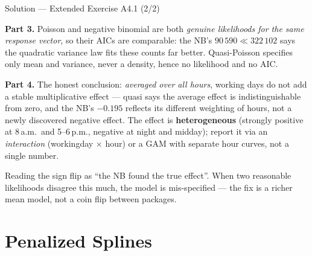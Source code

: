 \documentclass[aspectratio=169,11pt]{beamer}
\begin{document}
\begin{frame}{Solution --- Extended Exercise A4.1 (2/2)}
\begin{solutionbox}
  \textbf{Part 3.} Poisson and negative binomial are both \emph{genuine likelihoods
  for the same response vector}, so their AICs are comparable: the NB's
  $90\,590 \ll 322\,102$ says the quadratic variance law fits these counts far
  better. Quasi-Poisson specifies only mean and variance, never a density, hence
  no likelihood and no AIC.

  \textbf{Part 4.} The honest conclusion: \emph{averaged over all hours}, working days
  do not add a stable multiplicative effect --- quasi says the average effect is
  indistinguishable from zero, and the NB's $-0.195$ reflects its different weighting
  of hours, not a newly discovered negative effect. The effect is
  \textbf{heterogeneous} (strongly positive at 8\,a.m.\ and 5--6\,p.m., negative at
  night and midday); report it via an \emph{interaction} (workingday $\times$ hour) or
  a GAM with separate hour curves, not a single number.
\end{solutionbox}
\begin{mistake}
  Reading the sign flip as ``the NB found the true effect''. When two reasonable
  likelihoods disagree this much, the model is mis-specified --- the fix is a richer
  mean model, not a coin flip between packages.
\end{mistake}
\end{frame}

\section{Penalized Splines}
\end{document}
